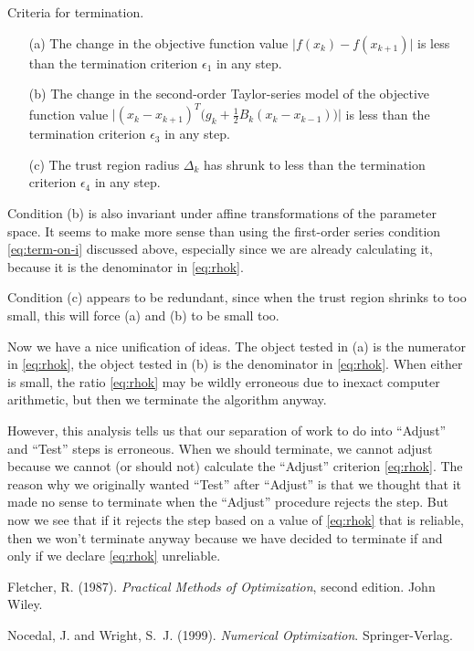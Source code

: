 \documentclass[11pt]{article}
\begin{document}
Criteria for termination.
\begin{enumerate}
\item[(a)] The change in the objective function
    value $\lvert f(x_k) - f(x_{k + 1}) \rvert$ is less than
    the termination criterion $\epsilon_1$ in any step.
\item[(b)] The change in the second-order Taylor-series model
    of the objective function
    value $\bigl\lvert (x_k - x_{k + 1})^T \bigl( g_k +
    \tfrac{1}{2} B_k (x_k - x_{k - 1}) \bigr) \bigr\rvert$
    is less than the termination criterion $\epsilon_3$ in
    any step.
\item[(c)] The trust region radius $\Delta_k$ has shrunk to less than
    the termination criterion $\epsilon_4$ in any step.
\end{enumerate}

Condition (b) is also invariant under affine transformations of the
parameter space.  It seems to make more sense than using the first-order
series condition \eqref{eq:term-on-i} discussed above, especially since
we are already calculating it, because it is the denominator
in \eqref{eq:rhok}.

Condition (c) appears to be redundant, since when the trust region
shrinks to too small, this will force (a) and (b) to be small too.

Now we have a nice unification of ideas.
The object tested in (a) is the numerator in \eqref{eq:rhok},
the object tested in (b) is the denominator in \eqref{eq:rhok}.
When either is small, the ratio \eqref{eq:rhok} may be wildly
erroneous due to inexact computer arithmetic, but then we terminate
the algorithm anyway.

However, this analysis tells us that our separation of work to do into
``Adjust'' and ``Test'' steps is erroneous.  When we should terminate,
we cannot adjust because we cannot (or should not) calculate the
``Adjust'' criterion \eqref{eq:rhok}.
The reason why we originally wanted ``Test'' after ``Adjust'' is that
we thought that it made no sense to terminate when the ``Adjust''
procedure rejects the step.
But now we see that if it rejects the step based on a value of
\eqref{eq:rhok} that is reliable, then we won't terminate anyway
because we have decided to terminate if and only if we declare
\eqref{eq:rhok} unreliable.

\begin{thebibliography}{}

Fletcher, R. (1987).
\newblock \emph{Practical Methods of Optimization}, second edition.
\newblock John Wiley.

Nocedal, J. and Wright, S.~J. (1999).
\newblock \emph{Numerical Optimization}.
\newblock Springer-Verlag.

\end{thebibliography}
\end{document}
